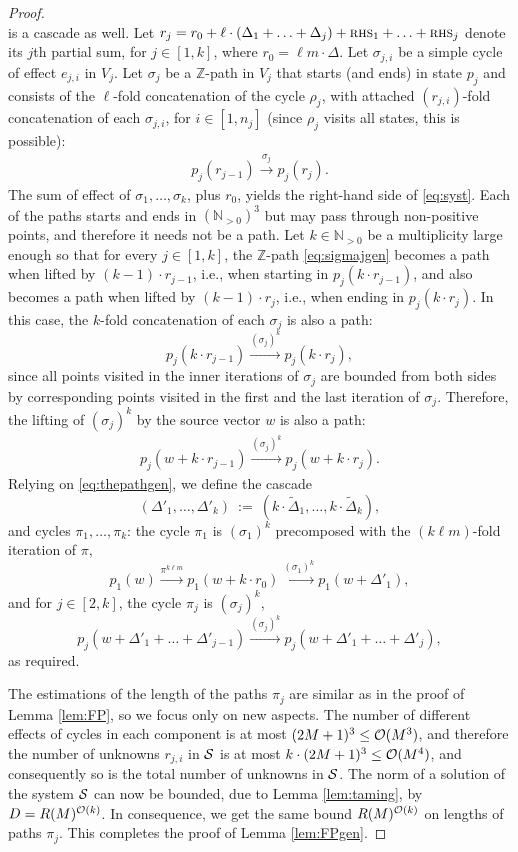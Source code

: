 \documentclass[a4paper, UKenglish, cleveref, autoref, thm-restate]{lipics-v2021}
\newcommand{\N}{\mathbb{N}}
\newcommand{\Z}{\mathbb{Z}}
\newcommand{\trans}[1]{\stackrel{#1}{\longrightarrow}}
\newcommand{\OO}{{\cal O}}
\newcommand{\setfromto}[2]{[#1, #2]}
\newcommand{\setto}[1]{\setfromto 1 {#1}}
\newcommand{\Npos}{\N_{>0}}
\newcommand{\rhs}{\textsc{rhs}}
\begin{document}
\begin{appendixproof}
\begin{proof}
\[\]
is a cascade as well.
Let $r_j = r_0 + \ell\cdot(\Delta_1 + \ldots + \Delta_j) + \rhs_1 + \ldots + \rhs_j$
denote its $j$th partial sum, for $j\in\setto k$, where $r_0 = \ell m \cdot \Delta$.
Let $\sigma_{j,i}$ be a simple cycle of effect $e_{j,i}$ in $V_j$.
Let $\sigma_j$
be a $\Z$-path in $V_j$ that starts (and ends) in state $p_j$ and consists of the  
$\ell$-fold concatenation of the cycle $\rho_j$, with attached 
$(r_{j,i})$-fold concatenation of each $\sigma_{j,i}$, for $i\in \setto{n_j}$
(since $\rho_j$ visits all states, this is possible):
\begin{align} \label{eq:sigmajgen}
p_j(r_{j-1}) \trans{\sigma_j} p_j(r_j).
\end{align}
The sum of effect of $\sigma_1, \ldots, \sigma_k$, plus $r_0$, 
yields the right-hand side of \eqref{eq:syst}.
Each of the paths starts and ends in $(\Npos)^3$ but may pass through non-positive points, and therefore it
needs not be a path.
Let $k\in\Npos$ be a multiplicity large enough so that for every $j\in \setto k$, 
the $\Z$-path \eqref{eq:sigmajgen} becomes a path
when lifted by $(k-1) \cdot r_{j-1}$,
i.e., when starting in $p_j(k \cdot r_{j-1})$, 
and also becomes a path when lifted by $(k-1)\cdot r_j$, i.e., when
ending in 
$p_j(k \cdot r_j)$.
In this case, the $k$-fold concatenation of each $\sigma_j$ is also a path:
\[
p_j(k\cdot r_{j-1}) \trans{(\sigma_j)^k} p_j(k \cdot r_j),
\]
since all points visited in the inner iterations of $\sigma_j$ are bounded 
from both sides by corresponding points visited in the first and the last iteration of $\sigma_j$.
Therefore, the lifting of $(\sigma_j)^k$ by the source vector $w$ is also a path:
\begin{align} \label{eq:thepathgen}
p_j(w+k\cdot r_{j-1}) \trans{(\sigma_j)^k} p_j(w+k \cdot r_j).
\end{align}
Relying on \eqref{eq:thepathgen},
we define the cascade
\[
(\Delta'_1, \ldots, \Delta'_k) \ := \ (k \cdot \widetilde\Delta_1, \ldots, k \cdot \widetilde\Delta_k),
\]
and cycles $\pi_1, \ldots, \pi_k$:
the cycle $\pi_1$ is  $(\sigma_1)^k$ precomposed with the $(k\ell m)$-fold iteration
of $\pi$,
\[
p_1(w) \trans{\pi^{k\ell m}} p_1(w + k\cdot r_0) \trans{(\sigma_1)^k} p_1(w + \Delta'_1),
\]
and for $j\in\setfromto 2 k$, the cycle $\pi_j$ is $(\sigma_j)^k$,
\[
p_j(w + \Delta'_1 + \ldots + \Delta'_{j-1}) \trans{(\sigma_j)^k}
p_j(w + \Delta'_1 + \ldots + \Delta'_{j}),
\]
as required.


The estimations of the length of the paths $\pi_j$ are similar as in the proof of Lemma \ref{lem:FP},
so we focus only on new aspects.
The number of different effects of cycles in each component is at most $(2M+1)^3\leq \OO(M^3)$, 
and therefore
the number of unknowns $r_{j,i}$ in $\cal S$
is at most $k\cdot (2M+1)^3 \leq \OO(M^4)$, and consequently so is the 
total number of unknowns in $\cal S$.
The norm of a solution of the system $\cal S$ can now be bounded, due to Lemma \ref{lem:taming},
by $D = R(M)^{\OO(k)}$.
In consequence, we get the same bound $R(M)^{\OO(k)}$ on lengths of paths $\pi_j$.
This completes
the proof of Lemma  \ref{lem:FPgen}.
\end{proof}


\end{appendixproof}
\end{document}
